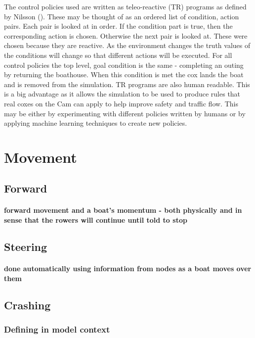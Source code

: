       The control policies used are written as teleo-reactive (TR) programs as defined by Nilsson (\cite{Nilsson1994}). These may be thought of as an ordered list of condition, action pairs. Each pair is looked at in order. If the condition part is true, then the corresponding action is chosen. Otherwise the next pair is looked at. These were chosen because they are reactive. As the environment changes the truth values of the conditions will change so that different actions will be executed. For all control policies the top level, goal condition is the same - completing an outing by returning the boathouse. When this condition is met the cox lands the boat and is removed from the simulation. TR programs are also human readable. This is a big advantage as it allows the simulation to be used to produce rules that real coxes on the Cam can apply to help improve safety and traffic flow. This may be either by experimenting with different policies written by humans or by applying machine learning techniques to create new policies.
      
  \section{Movement}
    \subsection{Forward}
      \paragraph{forward movement and a boat's momentum - both physically and in sense that the rowers will continue until told to stop}
    \subsection{Steering}
      \paragraph{done automatically using information from nodes as a boat moves over them}
    \subsection{Crashing}\label{model:movement:crashing}
      \subsubsection{Defining in model context}
